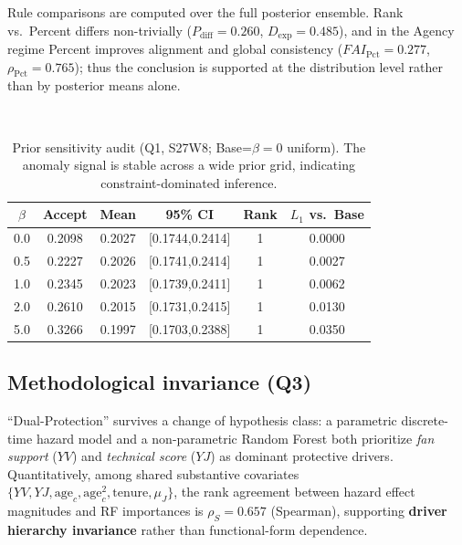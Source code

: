 Rule comparisons are computed over the full posterior ensemble. Rank vs.\ Percent differs non-trivially ($P_{\mathrm{diff}}=0.260$, $D_{\exp}=0.485$), and in the Agency regime Percent improves alignment and global consistency ($FAI_{\mathrm{Pct}}=0.277$, $\rho_{\mathrm{Pct}}=0.765$); thus the conclusion is supported at the distribution level rather than by posterior means alone.


\vspace{1ex}


\vspace{-0.45em}
\begin{table}[H]
\centering
\caption{Prior sensitivity audit (Q1, S27W8; Base=$\beta=0$ uniform). The anomaly signal is stable across a wide prior grid, indicating constraint-dominated inference.}
\label{tab:prior_sens_short}
\scriptsize
\setlength{\tabcolsep}{15.3pt}  
\renewcommand{\arraystretch}{0.93}
\begin{tabular}{@{}cccccc@{}}
\toprule
$\beta$ & Accept & Mean & 95\% CI & Rank & $L_1$ vs.\ Base \\
\midrule
0.0 & 0.2098 & 0.2027 & [0.1744,0.2414] & 1 & 0.0000 \\
0.5 & 0.2227 & 0.2026 & [0.1741,0.2414] & 1 & 0.0027 \\
1.0 & 0.2345 & 0.2023 & [0.1739,0.2411] & 1 & 0.0062 \\
2.0 & 0.2610 & 0.2015 & [0.1731,0.2415] & 1 & 0.0130 \\
5.0 & 0.3266 & 0.1997 & [0.1703,0.2388] & 1 & 0.0350 \\
\bottomrule
\end{tabular}
\vspace{-1.0em}
\end{table}

\vspace{-0.25em}
\subsection{Methodological invariance (Q3)}
\vspace{-0.35em}

\noindent ``Dual-Protection'' survives a change of hypothesis class: a parametric discrete-time hazard model and a non-parametric Random Forest both prioritize \emph{fan support} ($YV$) and \emph{technical score} ($YJ$) as dominant protective drivers. Quantitatively, among shared substantive covariates $\{YV,YJ,\mathrm{age}_c,\mathrm{age}_c^2,\mathrm{tenure},\mu_J\}$, the rank agreement between hazard effect magnitudes and RF importances is $\rho_S=0.657$ (Spearman), supporting \textbf{driver hierarchy invariance} rather than functional-form dependence.

